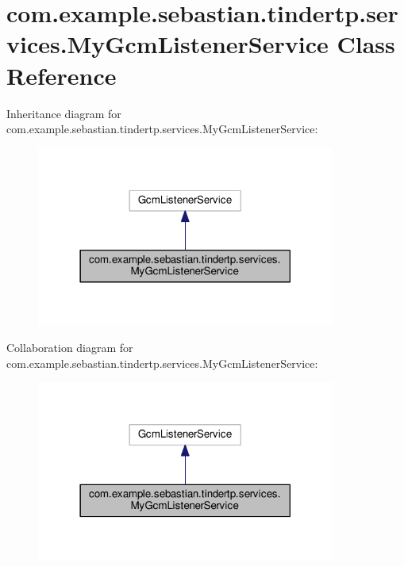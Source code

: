 \hypertarget{classcom_1_1example_1_1sebastian_1_1tindertp_1_1services_1_1MyGcmListenerService}{}\section{com.\+example.\+sebastian.\+tindertp.\+services.\+My\+Gcm\+Listener\+Service Class Reference}
\label{classcom_1_1example_1_1sebastian_1_1tindertp_1_1services_1_1MyGcmListenerService}


Inheritance diagram for com.\+example.\+sebastian.\+tindertp.\+services.\+My\+Gcm\+Listener\+Service\+:
\nopagebreak
\begin{figure}[H]
\begin{center}
\leavevmode
\includegraphics[width=278pt]{classcom_1_1example_1_1sebastian_1_1tindertp_1_1services_1_1MyGcmListenerService__inherit__graph}
\end{center}
\end{figure}


Collaboration diagram for com.\+example.\+sebastian.\+tindertp.\+services.\+My\+Gcm\+Listener\+Service\+:
\nopagebreak
\begin{figure}[H]
\begin{center}
\leavevmode
\includegraphics[width=278pt]{classcom_1_1example_1_1sebastian_1_1tindertp_1_1services_1_1MyGcmListenerService__coll__graph}
\end{center}
\end{figure}
